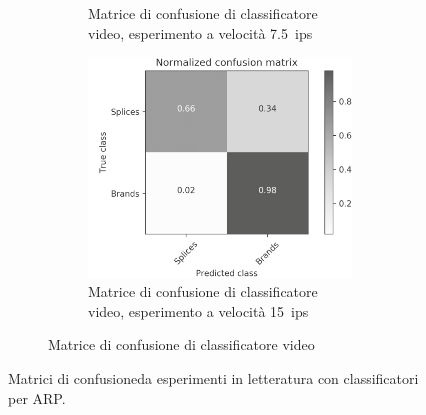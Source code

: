 \begin{figure}[h]
\begin{minipage}{\textwidth}
\begin{subfigure}{0.9\textwidth}
\begin{subfigure}{0.45\textwidth}
                \caption{Matrice di confusione di classificatore video, esperimento a velocità \qty{7,5}{ips}}
                \label{fig:confusion-matrix-video-classification-7dot5ips-tape}
            \end{subfigure}
            \hfill
            \begin{subfigure}{0.45\textwidth}
                \centering
                \includegraphics[width=\textwidth]{img/confusion-matrix-video-classification-15ips-tape.png}
                \caption{Matrice di confusione di classificatore video, esperimento a velocità \qty{15}{ips}}
                \label{fig:confusion-matrix-video-classification-15ips-tape}
            \end{subfigure}
            \caption{Matrice di confusione di classificatore video \cite[fig. 3]{prettoComputingMethodologiesSupporting2018}}
            \label{fig:confusion-matrix-video-classification}
         \end{subfigure}
            \caption[Matrici di confusione da esperimenti in letteratura con classificatori per \ac{ARP}.]{Matrici di confusione\footnotemark da esperimenti in letteratura con classificatori per \ac{ARP}.}
            \label{fig:confusion-matrix-audio-video}
        \mpfootnotes
    \end{minipage}
\end{figure}

